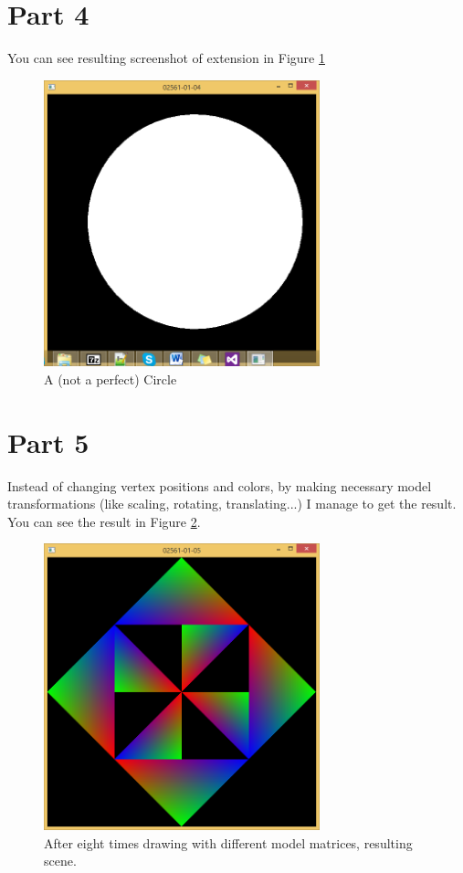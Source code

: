 \section{Part 4}
\label{sec:del-4}

You can see resulting screenshot of extension in Figure \ref{fig:1-4-1} 

\begin{figure}[hp]
\centering
\includegraphics[width=8cm]{../Screenshots/ex-1/4.png}
\caption{A (not a perfect) Circle}
\label{fig:1-4-1}
\end{figure}

\section{Part 5}
\label{sec:del-5}

Instead of changing vertex positions and colors, by making necessary model transformations (like scaling, rotating, translating...) I manage to get the result. You can see the result in Figure \ref{fig:1-5-1}.
 
\begin{figure}[hp]
\centering
\includegraphics[width=8cm]{../Screenshots/ex-1/5.png}
\caption{After eight times drawing with different model matrices, resulting scene.}
\label{fig:1-5-1}
\end{figure}



